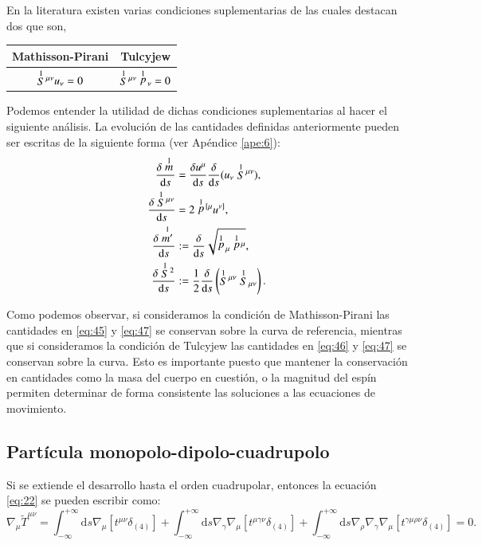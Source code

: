 En la literatura existen varias condiciones suplementarias de las cuales destacan dos que son,
\begin{center}
\begin{tabular}{cc}
\hline
Mathisson-Pirani & Tulcyjew \\
\hline \hline
$\stackrel{1}{S}{\!}^{\mu \nu} u_{\nu} = 0 $ & $\stackrel{1}{S}{\!}^{\mu \nu} \stackrel{1}{p}{\!}_{\nu} = 0 $ \\
\hline
\end{tabular}
\end{center}

Podemos entender la utilidad de dichas condiciones suplementarias al hacer el siguiente análisis. La evolución de las cantidades definidas anteriormente pueden ser escritas de la siguiente forma (ver Apéndice \ref{ape:6}):
\begin{align}
\label{eq:45}
\cd{\des{1}{m}} &= \cd{u^{\mu}} \cd{}(u_{\nu} \des{1}{S}^{\mu \nu}),\\
\label{eq:103}
\cd{\des{1}{S}^{\mu \nu}} &= 2 \des{1}{p}^{[\mu} u^{\nu]},\\
\label{eq:46}
\cd{\des{1}{m'}} &:= \cd{}\sqrt{\des{1}{p}_{\mu}\des{1}{p}^{\mu}},\\
\label{eq:47}
\cd{\des{1}{S}^2} &:= \frac{1}{2} \cd{} \left( \des{1}{S}^{\mu \nu} \des{1}{S}_{\mu \nu} \right).
\end{align}

Como podemos observar, si consideramos la condición de Mathisson-Pirani las cantidades en \eqref{eq:45} y \eqref{eq:47} se conservan sobre la curva de referencia, mientras que si consideramos la condición de Tulcyjew las cantidades en \eqref{eq:46} y \eqref{eq:47} se conservan sobre la curva. Esto es importante puesto que mantener la conservación en cantidades como la masa del cuerpo en cuestión, o la magnitud del espín permiten determinar de forma consistente las soluciones a las ecuaciones de movimiento.

\subsection{Partícula monopolo-dipolo-cuadrupolo}

Si se extiende el desarrollo hasta el orden cuadrupolar, entonces la ecuación \eqref{eq:22} se pueden escribir como:
\begin{equation}
\label{eq:48}
\nabla_{\mu} \tilde{T}^{\mu \nu} = \int_{-\infty}^{+\infty} \mathrm{d}s \nabla_{\mu} [ t^{\mu \nu} \delta_{(4)}] + \int_{-\infty}^{+\infty} \mathrm{d}s \nabla_{\gamma}\nabla_{\mu} [ t^{\mu \gamma \nu} \delta_{(4)}] + \int_{-\infty}^{+\infty} \mathrm{d}s \nabla_{\rho} \nabla_{\gamma} \nabla_{\mu} [ t^{\gamma \mu \rho \nu} \delta_{(4)}] = 0.
\end{equation}

